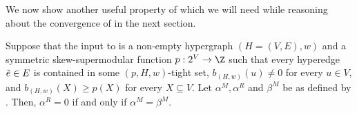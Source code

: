 We now show another useful property of  which we will need while reasoning about the convergence of  in the next section.
\begin{lemma}\label{lem:WeakToStrong:alpha^R=0-iff-alpha^M=beta^M}
Suppose that the input to  is a non-empty hypergraph $(H = (V, E), w)$ and a symmetric skew-supermodular function $p:2^V\rightarrow \Z$
such that every hyperedge $\Tilde{e} \in E$ is contained in some $(p, H, w)$-tight set, $b_{(H,w)}(u) \not = 0$ for every $u \in V$, and $b_{(H,w)}(X) \geq p(X)$ for every $X \subseteq V$. 
 Let $\alpha^M, \alpha^R$ and $\beta^M$ be as defined by .  
 Then, $\alpha^R = 0$ if and only if $\alpha^M = \beta^M$.
\end{lemma}
